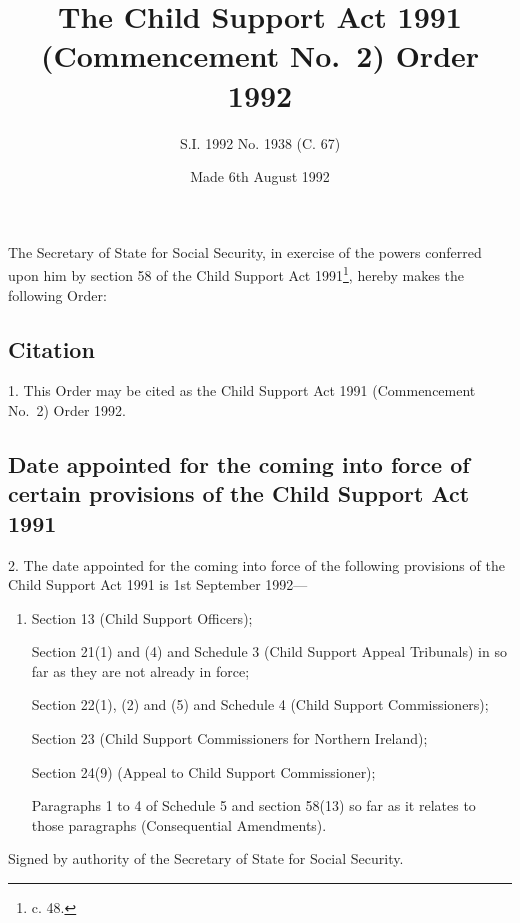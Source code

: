 \documentclass[a4paper]{article}
\title{The Child Support Act 1991 (Commencement No.\ 2) Order 1992}
\author{S.I. 1992 No. 1938 (C. 67)}
\date{Made 6th August 1992}
\begin{document}
\maketitle

\noindent
The Secretary of State for Social Security, in exercise of the powers conferred upon him by section 58 of the Child Support Act 1991\footnote{ c. 48.}, hereby makes the following Order:

{\sloppy

\tableofcontents

}

\setcounter{secnumdepth}{-2}

\subsection[1. Citation]{Citation}

1.  This Order may be cited as the Child Support Act 1991 (Commencement No.\ 2) Order 1992.

\subsection[2. Date appointed for the coming into force of certain provisions of the Child Support Act 1991]{Date appointed for the coming into force of certain provisions of the Child Support Act 1991}

2.  The date appointed for the coming into force of the following provisions of the Child Support Act 1991 is 1st September 1992—
\begin{enumerate}\item[]
Section 13 (Child Support Officers);

Section 21(1) and (4) and Schedule 3 (Child Support Appeal Tribunals) in so far as they are not already in force;

Section 22(1), (2) and (5) and Schedule 4 (Child Support Commissioners);

Section 23 (Child Support Commissioners for Northern Ireland);

Section 24(9) (Appeal to Child Support Commissioner);

Paragraphs 1 to 4 of Schedule 5 and section 58(13) so far as it relates to those paragraphs (Consequential Amendments).
\end{enumerate}

\bigskip

Signed by authority of the Secretary of State for Social Security.
\end{document}
